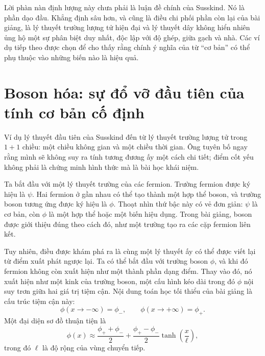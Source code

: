 Lời phàn nàn định lượng này chưa phải là luận đề chính của Susskind. Nó là phần dạo đầu. Khẳng định sâu hơn, và cũng là điều chi phối phần còn lại của bài giảng, là lý thuyết trường lượng tử hiện đại và lý thuyết dây không hiển nhiên ủng hộ một sự phân biệt duy nhất, độc lập với độ ghép, giữa gạch và nhà. Các ví dụ tiếp theo được chọn để cho thấy rằng chính ý nghĩa của từ ``cơ bản'' có thể phụ thuộc vào những biến nào là hiệu quả.

\section{Boson hóa: sự đổ vỡ đầu tiên của tính cơ bản cố định}

Ví dụ lý thuyết đầu tiên của Susskind đến từ lý thuyết trường lượng tử trong \(1+1\) chiều: một chiều không gian và một chiều thời gian. Ông tuyên bố ngay rằng mình sẽ không suy ra tính tương đương ấy một cách chi tiết; điểm cốt yếu không phải là chứng minh hình thức mà là bài học khái niệm.

Ta bắt đầu với một lý thuyết trường của các fermion. Trường fermion được ký hiệu là \(\psi\). Hai fermion ở gần nhau có thể tạo thành một hợp thể boson, và trường boson tương ứng được ký hiệu là \(\phi\). Thoạt nhìn thứ bậc này có vẻ đơn giản: \(\psi\) là cơ bản, còn \(\phi\) là một hợp thể hoặc một biến hiệu dụng. Trong bài giảng, boson được giới thiệu đúng theo cách đó, như một trường tạo ra các cặp fermion liên kết.

Tuy nhiên, điều được khám phá ra là cùng một lý thuyết ấy có thể được viết lại từ điểm xuất phát ngược lại. Ta có thể bắt đầu với trường boson \(\phi\), và khi đó fermion không còn xuất hiện như một thành phần dạng điểm. Thay vào đó, nó xuất hiện như một kink của trường boson, một cấu hình kéo dài trong đó \(\phi\) nội suy trơn giữa hai giá trị tiệm cận. Nội dung toán học tối thiểu của bài giảng là cấu trúc tiệm cận này:
\begin{equation}
\phi(x\to -\infty)=\phi_-,
\qquad
\phi(x\to +\infty)=\phi_+.
\end{equation}
Một đại diện sơ đồ thuận tiện là
\begin{equation}
\phi(x)\approx \frac{\phi_++\phi_-}{2}
+
\frac{\phi_+-\phi_-}{2}\tanh\!\left(\frac{x}{\ell}\right),
\end{equation}
trong đó \(\ell\) là độ rộng của vùng chuyển tiếp.



